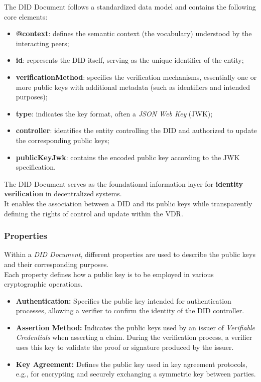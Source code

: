\noindent
The DID Document follows a standardized data model and contains the following core elements:
\begin{itemize}
    \item \textbf{@context}: defines the semantic context (the vocabulary) understood by the interacting peers;
    \item \textbf{id}: represents the DID itself, serving as the unique identifier of the entity;
    \item \textbf{verificationMethod}: specifies the verification mechanisms, essentially one or more public keys with additional metadata (such as identifiers and intended purposes);
    \item \textbf{type}: indicates the key format, often a \textit{JSON Web Key} (JWK);
    \item \textbf{controller}: identifies the entity controlling the DID and authorized to update the corresponding public keys;
    \item \textbf{publicKeyJwk}: contains the encoded public key according to the JWK specification.
\end{itemize}

\noindent
The DID Document serves as the foundational information layer for \textbf{identity verification} in decentralized systems.\\
It enables the association between a DID and its public keys while transparently defining the rights of control and update within the VDR.

\subsubsection{Properties}
Within a \textit{DID Document}, different properties are used to describe the public keys and their corresponding purposes.\\  
Each property defines how a public key is to be employed in various cryptographic operations.

\begin{itemize}
    \item \textbf{Authentication:}  
    Specifies the public key intended for authentication processes, allowing a verifier to confirm the identity of the DID controller.

    \item \textbf{Assertion Method:}  
    Indicates the public keys used by an issuer of \textit{Verifiable Credentials} when asserting a claim.  
    During the verification process, a verifier uses this key to validate the proof or signature produced by the issuer.

    \item \textbf{Key Agreement:}  
    Defines the public key used in key agreement protocols, e.g., for encrypting and securely exchanging a symmetric key between parties.
\end{itemize}

